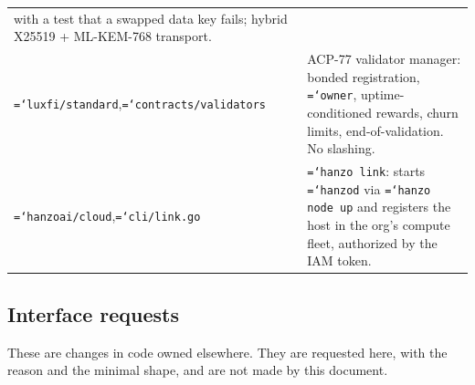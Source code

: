 \documentclass[11pt,a4paper]{article}
\newcommand{\code}[1]{\texttt{\hyphenchar\font=`\-\relax #1}}
\begin{document}
\begin{center}
\begin{tabular}{@{}>{\raggedright\arraybackslash}p{}>{\raggedright\arraybackslash}p{}@{}}
with a test that a swapped data key fails; hybrid X25519 + ML-KEM-768 transport. \\[3pt]
\code{luxfi/standard},\newline \code{contracts/validators} &
ACP-77 validator manager: bonded registration, \code{owner}, uptime-conditioned
rewards, churn limits, end-of-validation. No slashing. \\[3pt]
\code{hanzoai/cloud},\newline \code{cli/link.go} &
\code{hanzo link}: starts \code{hanzod} via \code{hanzo node up} and registers the
host in the org's compute fleet, authorized by the IAM token. \\
\bottomrule
\end{tabular}
\end{center}

\subsection{Interface requests}
\label{sec:req}

These are changes in code owned elsewhere. They are requested here, with the reason
and the minimal shape, and are not made by this document.
\end{document}
